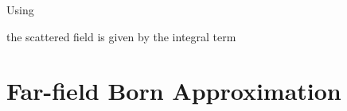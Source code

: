 Using 

the scattered field is given by the integral term

%








\section{Far-field Born Approximation}
\label{bornapprox}

